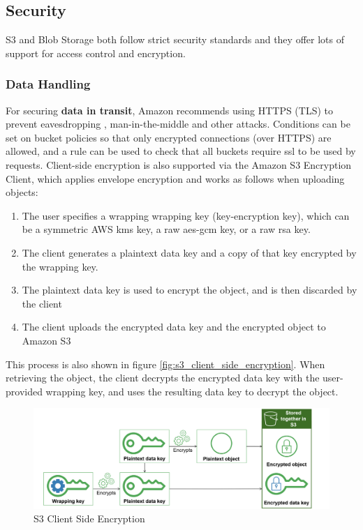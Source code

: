 \subsection{Security}
S3 and Blob Storage both follow strict security standards and they offer lots of support for access control and encryption.

\subsubsection{Data Handling}
For securing \textbf{data in transit}, Amazon recommends using HTTPS (TLS) to prevent eavesdropping , man-in-the-middle and other attacks. Conditions can be set on bucket policies so that only encrypted connections (over HTTPS) are allowed, and a rule can be used to check that all buckets require \ac{ssl} to be used by requests. Client-side encryption is also supported via the Amazon S3 Encryption Client, which applies envelope encryption and works as follows when uploading objects:

\begin{enumerate}
	\item The user specifies a wrapping wrapping key (key-encryption key), which can be a symmetric AWS \ac{kms} key, a raw \ac{aes-gcm} key, or a raw \ac{rsa} key.
	
	\item The client generates a plaintext data key and a copy of that key encrypted by the wrapping key. 
	
	\item The plaintext data key is used to encrypt the object, and is then discarded by the client
	
	\item The client uploads the encrypted data key and the encrypted object to Amazon S3
\end{enumerate}

This process is also shown in figure \autoref{fig:s3_client_side_encryption}. When retrieving the object, the client decrypts the encrypted data key with the user-provided wrapping key, and uses the resulting data key to decrypt the object.

\begin{figure} [h]
	\centering
	\includegraphics[scale=0.6]{images/s3_client_side_encryption}
	\caption{\label{fig:s3_client_side_encryption}S3 Client Side Encryption}
\end{figure}

